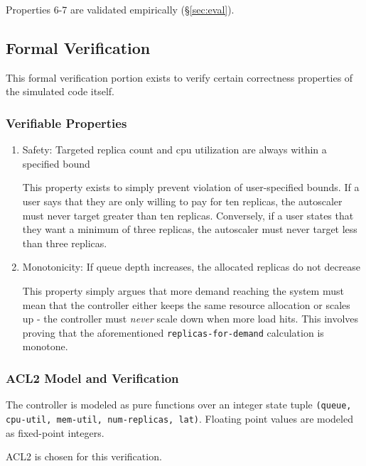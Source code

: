 \documentclass[twocolumn]{article}
\begin{document}
Properties 6-7 are validated empirically (\S\ref{sec:eval}).
\subsection{Formal Verification}
\label{sec:org85bcb21}
\label{sec:acl2}

This formal verification portion exists to verify certain correctness properties of the simulated code itself.
\subsubsection{Verifiable Properties}
\label{sec:org5b0bc43}

\begin{enumerate}
\item Safety: Targeted replica count and cpu utilization are always within a specified bound

This property exists to simply prevent violation of user-specified bounds. If a user says that they are only willing to pay for ten replicas, the autoscaler must never target greater than ten replicas. Conversely, if a user states that they want a minimum of three replicas, the autoscaler must never target less than three replicas.

\item Monotonicity: If queue depth increases, the allocated replicas do not decrease

This property simply argues that more demand reaching the system must mean that the controller either keeps the same resource allocation or scales up - the controller must \emph{never} scale down when more load hits. This involves proving that the aforementioned \texttt{replicas-for-demand} calculation is monotone.
\end{enumerate}
\subsubsection{ACL2 Model and Verification}
\label{sec:org7e6768c}

The controller is modeled as pure functions over an integer state tuple \texttt{(queue, cpu-util, mem-util, num-replicas, lat)}. Floating point values are modeled as fixed-point integers.

ACL2 is chosen for this verification.
\end{document}

